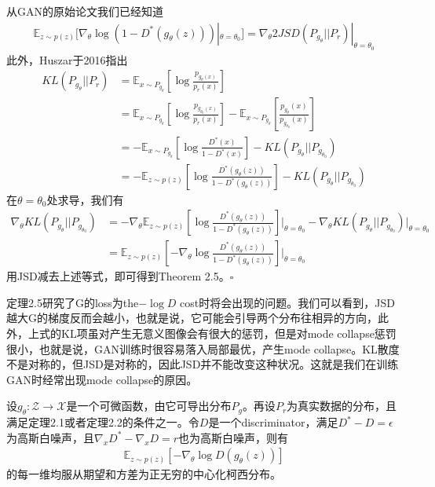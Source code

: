             \begin{Proof}
            从GAN的原始论文我们已经知道
            \begin{align*}
            \mathbb{E}_{z\sim p(z)}[\nabla_\theta \log(1-D^*(g_\theta(z)))|_{\theta=\theta_0}] = \nabla_\theta 2JSD(P_{g_\theta}||P_r)|_{\theta=\theta_0}
            \end{align*}
            此外，Huszar于2016指出
            \begin{align*}
            KL(P_{g_\theta}||P_r) & = \mathbb{E}_{x\sim P_{g_\theta}}\left[ \log\frac{p_{g_\theta(x)}}{p_r(x)} \right]\\
            & =\mathbb{E}_{x\sim P_{g_\theta}}\left[ \log\frac{p_{g_{\theta_0}(x)}}{p_r(x)} \right] - \mathbb{E}_{x\sim P_{g_\theta}}\left[ \frac{p_{g_\theta}(x)}{p_{g_{\theta_0}}(x)} \right]\\
            &=-\mathbb{E}_{x\sim P_{g_\theta}}\left[ \log \frac{D^*(x)}{1-D^*(x)} \right]-KL(P_{g_\theta}||P_{g_{\theta_0}})\\
            &=-\mathbb{E}_{z\sim p(z)}\left[ \log \frac{D^*(g_\theta(z))}{1-D^*(g_\theta(z))} \right]-KL(P_{g_\theta}||P_{g_{\theta_0}})
            \end{align*}
            在$\theta = \theta_0$处求导，我们有
            \begin{align*}
            \nabla_\theta KL(P_{g_\theta}||P_{g_{\theta_0}}) &= -\nabla_\theta\mathbb{E}_{z\sim p(z)} \left[\log \frac{D^*(g_\theta(z))}{1-D^*(g_\theta(z))}\right]\Big|_{\theta=\theta_0} - \nabla_\theta KL(P_{g_\theta}||P_{g_{\theta_0}})|_{\theta=\theta_0}\\
            &=\mathbb{E}_{z\sim p(z)} \left[-\nabla_\theta\log \frac{D^*(g_\theta(z))}{1-D^*(g_\theta(z))}\right]\Big|_{\theta=\theta_0}
            \end{align*}
            用JSD减去上述等式，即可得到Theorem 2.5。$\square$
            \end{Proof}
            \par
            定理2.5研究了G的loss为the$ -\log D$ cost时将会出现的问题。我们可以看到，JSD越大G的梯度反而会越小，也就是说，它可能会引导两个分布往相异的方向，此外，上式的KL项虽对产生无意义图像会有很大的惩罚，但是对mode collapse惩罚很小，也就是说，GAN训练时很容易落入局部最优，产生mode collapse。KL散度不是对称的，但JSD是对称的，因此JSD并不能改变这种状况。这就是我们在训练GAN时经常出现mode collapse的原因。
            \begin{theorem}
            设$g_\theta:\mathcal{Z}\to \mathcal{X}$是一个可微函数，由它可导出分布$P_g$。再设$P_r$为真实数据的分布，且满足定理2.1或者定理2.2的条件之一。令$D$是一个discriminator，满足$D^* - D = \epsilon$为高斯白噪声，且$\nabla_x D^* - \nabla_x D = r$也为高斯白噪声，则有
            \begin{align*}
            \mathbb{E}_{z\sim p(z)} [-\nabla_\theta \log D(g_\theta(z))]
            \end{align*}
            的每一维均服从期望和方差为正无穷的中心化柯西分布。
            \end{theorem}
